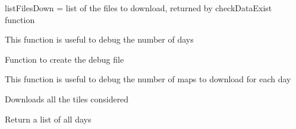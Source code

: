 \documentclass[a4paper,11pt,oneside]{sphinxmanual}
\begin{document}
\begin{fulllineitems}
\begin{fulllineitems}
listFilesDown = list of the files to download, returned by checkDataExist function

\end{fulllineitems}


\begin{fulllineitems}
\label{pymodis/pymodis:pymodis.downmodis.downModis.debugDays}
This function is useful to debug the number of days

\end{fulllineitems}


\begin{fulllineitems}
\label{pymodis/pymodis:pymodis.downmodis.downModis.debugLog}
Function to create the debug file

\end{fulllineitems}


\begin{fulllineitems}
\label{pymodis/pymodis:pymodis.downmodis.downModis.debugMaps}
This function is useful to debug the number of maps to download for
each day

\end{fulllineitems}


\begin{fulllineitems}
\label{pymodis/pymodis:pymodis.downmodis.downModis.downloadsAllDay}
Downloads all the tiles considered

\end{fulllineitems}


\begin{fulllineitems}
\label{pymodis/pymodis:pymodis.downmodis.downModis.getAllDays}
Return a list of all days

\end{fulllineitems}


\end{fulllineitems}
\end{document}
